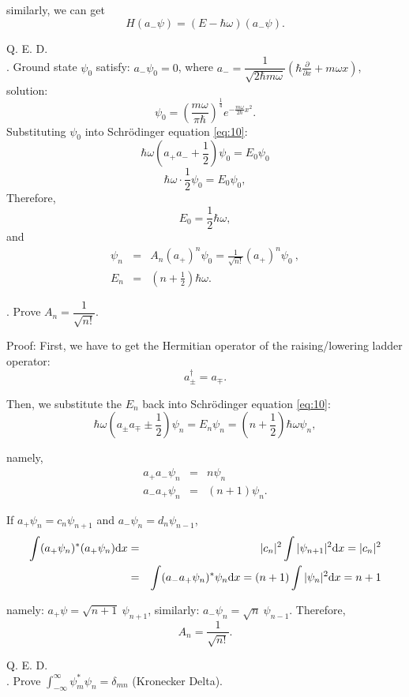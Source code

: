 \documentclass[12pt, 
]{article}
\begin{document}
similarly, we can get $$H(a_{-}\psi)=(E-\hbar\omega)(a_{-}\psi).$$

Q. E. D.
~\\

. Ground state $\psi_0$ satisfy: $a_{-}\psi_0=0$, where $a_{-}=\dfrac{1}{\sqrt{2\hbar m\omega}}\left (\hbar\frac{\partial}{\partial x}+m\omega x \right)$, solution:
\[
	\psi_0=\left (\frac{m\omega}{\pi\hbar}\right)^{\frac{1}{4}}e^{-\frac{m\omega}{2\hbar}x^2}.
\]
Substituting $\psi_0$ into Schr\"odinger equation \eqref{eq:10}:
\[
	\hbar\omega(a_+a_{-}+\frac{1}{2})\psi_0=E_0\psi_0 
\]
\[
	\hbar\omega\cdot\frac{1}{2}\psi_0=E_0\psi_0,
\]
Therefore,
\begin{equation}\label{eq:11}
	E_0=\frac{1}{2}\hbar\omega,
\end{equation}
and
\begin{eqnarray*}
	\psi_n&=&A_n(a_+)^n\psi_0=\frac{1}{\sqrt{n!}}(a_+)^n\psi_0~,\\
	E_n&=&(n+\frac{1}{2})\hbar\omega.
\end{eqnarray*}

. Prove $A_n=\dfrac{1}{\sqrt{n!}}.$

\noindent Proof: First, we have to get the Hermitian operator of the raising/lowering ladder operator:
\[
	a_\pm^{\dagger}=a_\mp.
\]

Then, we substitute the $E_n$ back into Schr\"odinger equation \eqref{eq:10}:
\[
	\hbar\omega(a_\pm a_\mp \pm\frac{1}{2})\psi_n=E_n\psi_n=(n+\frac{1}{2})\hbar\omega\psi_n
,\]

namely,
\begin{eqnarray}
	a_+a_{-}\psi_n&=&n\psi_n\\
	a_{-}a_+\psi_n&=&(n+1)\psi_n.
\end{eqnarray}

If $a_+\psi_n=c_n\psi_{n+1}$ and $a_{-}\psi_n=d_n\psi_{n-1}$,
\begin{eqnarray*}
	\int(a_+\psi_n)^*(a_+\psi_n){\rm d}x&=&|c_n|^2\int|\psi_{n+1}|^2{\rm d}x=|c_n|^2\\
	&=&\int(a_{-}a_+\psi_n)^*\psi_n{\rm d}x=(n+1)\int|\psi_n|^2{\rm d}x=n+1	
\end{eqnarray*}

namely: $a_+\psi=\sqrt{n+1}~\psi_{n+1}$, similarly: $a_{-}\psi_n=\sqrt{n}~\psi_{n-1}$. Therefore,
\[
	A_n=\frac{1}{\sqrt{n!}}.
\]

Q. E. D.
~\\

. Prove $\displaystyle\int_{-\infty}^{\infty}\psi_m^*\psi_n=\delta_{mn}$ (Kronecker Delta).
\end{document}
